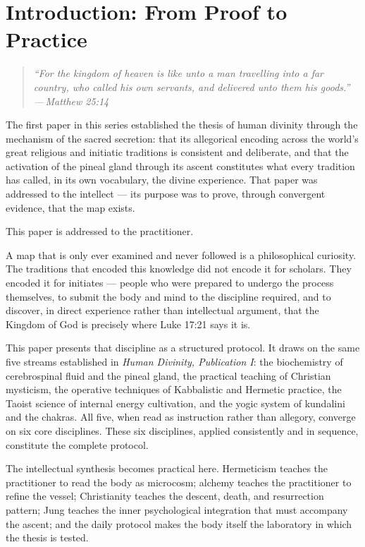\documentclass[12pt, a4paper]{article}
\newcommand{\epigraph}[2]{%
  \begin{quote}
    \itshape ``#1''\\[0.3em]
    \normalfont\small\hfill ---\,#2
  \end{quote}
}
\begin{document}
\newpage
\tableofcontents
\newpage

\section{Introduction: From Proof to Practice}

\epigraph{For the kingdom of heaven is like unto a man travelling into a far
country, who called his own servants, and delivered unto them his goods.}{Matthew
25:14}

The first paper in this series established the thesis of human divinity through
the mechanism of the sacred secretion: that its allegorical encoding across the world's great religious and initiatic
traditions is consistent and deliberate, and that the activation of the pineal
gland through its ascent constitutes what every tradition has called, in its
own vocabulary, the divine experience. That paper was addressed to the
intellect — its purpose was to prove, through convergent evidence, that the
map exists.

This paper is addressed to the practitioner.

A map that is only ever examined and never followed is a philosophical
curiosity. The traditions that encoded this knowledge did not encode it for
scholars. They encoded it for initiates — people who were prepared to undergo
the process themselves, to submit the body and mind to the discipline required,
and to discover, in direct experience rather than intellectual argument, that
the Kingdom of God is precisely where Luke 17:21 says it is.

This paper presents that discipline as a structured protocol. It draws on the
same five streams established in \emph{Human Divinity, Publication I}: the biochemistry
of cerebrospinal fluid and the pineal gland, the practical teaching of
Christian mysticism, the operative techniques of Kabbalistic and Hermetic
practice, the Taoist science of internal energy cultivation, and the yogic
system of kundalini and the chakras. All five, when read as instruction rather
than allegory, converge on six core disciplines. These six disciplines, applied
consistently and in sequence, constitute the complete protocol.

The intellectual synthesis becomes practical here. Hermeticism teaches the
practitioner to read the body as microcosm; alchemy teaches the practitioner
to refine the vessel; Christianity teaches the descent, death, and resurrection
pattern; Jung teaches the inner psychological integration that must accompany
the ascent; and the daily protocol makes the body itself the laboratory in
which the thesis is tested.
\end{document}
